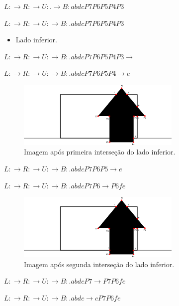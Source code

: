 \documentclass[12pt]{article}
\begin{document}
$L: \xrightarrow{} R: \xrightarrow{} U: . \xrightarrow{} B: abdcP7P6P5P4P3$

$L: \xrightarrow{} R: \xrightarrow{} U: \xrightarrow{} B: .abdcP7P6P5P4P3$

\begin{itemize}
    \item Lado inferior.
\end{itemize}

$L: \xrightarrow{} R: \xrightarrow{} U: \xrightarrow{} B: .abdcP7P6P5P4P3 \xrightarrow{} $

$L: \xrightarrow{} R: \xrightarrow{} U: \xrightarrow{} B: .abdcP7P6P5P4 \xrightarrow{} e$

\begin{figure}[H]
    \centering
    \includegraphics[width=0.7\textwidth]{images/5/5it6.png}
    \caption*{Imagem após primeira interseção do lado inferior.}
\end{figure}{}

$L: \xrightarrow{} R: \xrightarrow{} U: \xrightarrow{} B: .abdcP7P6P5 \xrightarrow{} e$

$L: \xrightarrow{} R: \xrightarrow{} U: \xrightarrow{} B: .abdcP7P6 \xrightarrow{} P6fe$

\begin{figure}[H]
    \centering
    \includegraphics[width=0.7\textwidth]{images/5/5it7.png}
    \caption*{Imagem após segunda interseção do lado inferior.}
\end{figure}{}

$L: \xrightarrow{} R: \xrightarrow{} U: \xrightarrow{} B: .abdcP7 \xrightarrow{} P7P6fe$

$L: \xrightarrow{} R: \xrightarrow{} U: \xrightarrow{} B: .abdc \xrightarrow{} cP7P6fe$
\end{document}
